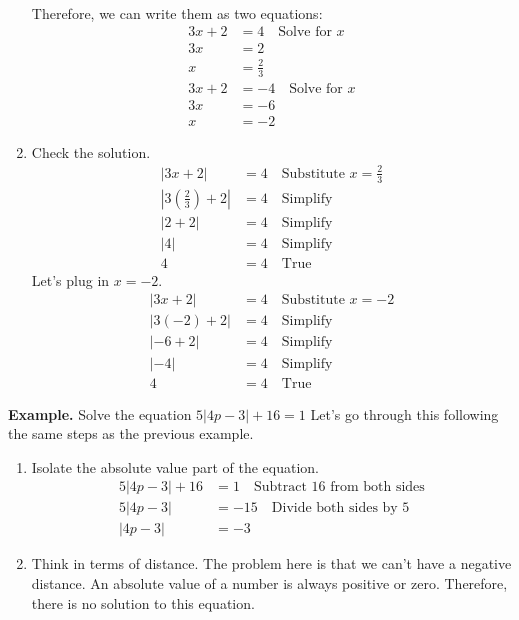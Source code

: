 \begin{enumerate}
	      \\
	      Therefore, we can write them as two equations:
	      \begin{align*}
		      3x+2 & =4 \quad \text{Solve for $x$}  \\
		      3x   & =2                             \\
		      x    & =\frac{2}{3}                   \\
		      3x+2 & =-4 \quad \text{Solve for $x$} \\
		      3x   & =-6                            \\
		      x    & =-2
	      \end{align*}
	\item Check the solution.
	      \begin{align*}
		      |3x+2|                        & =4 \quad \text{Substitute $x=\frac{2}{3}$} \\
		      |3\left(\frac{2}{3}\right)+2| & =4 \quad \text{Simplify}                   \\
		      |2+2|                         & =4 \quad \text{Simplify}                   \\
		      |4|                           & =4 \quad \text{Simplify}                   \\
		      4                             & =4 \quad \text{True}
	      \end{align*}
	      Let's plug in $x=-2$.
	      \begin{align*}
		      |3x+2|    & =4 \quad \text{Substitute $x=-2$} \\
		      |3(-2)+2| & =4 \quad \text{Simplify}          \\
		      |-6+2|    & =4 \quad \text{Simplify}          \\
		      |-4|      & =4 \quad \text{Simplify}          \\
		      4         & =4 \quad \text{True}
	      \end{align*}
\end{enumerate}

\textbf{Example.} Solve the equation $5|4p-3|+16=1$
Let's go through this following the same steps as the previous example.
\begin{enumerate}
	\item Isolate the absolute value part of the equation.
	      \begin{align*}
		      5|4p-3|+16 & =1 \quad \text{Subtract 16 from both sides} \\
		      5|4p-3|    & =-15 \quad \text{Divide both sides by 5}    \\
		      |4p-3|     & =-3
	      \end{align*}
	\item Think in terms of distance.
	      The problem here is that we can't have a negative distance. An absolute value of a number is always positive or zero. Therefore, there is no solution to this equation.
\end{enumerate}